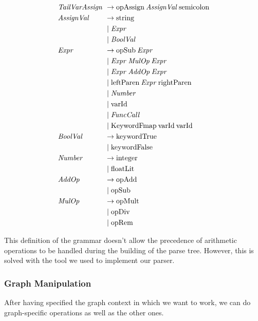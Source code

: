 \begin{align*}
    \omit $\mathit{TailVarAssign}$ \hfil & \rightarrow \text{opAssign} \: \mathit{AssignVal} \: \text{semicolon} \\
    \omit $\mathit{AssignVal}$ \hfil & \rightarrow \text{string} \\
    & \mid \mathit{Expr} \\
    & \mid \mathit{BoolVal}\\
    \omit $\mathit{Expr}$ \hfil & \rightarrow \text{opSub} \: \mathit{Expr} \\
    & \mid \mathit{Expr} \: \mathit{MulOp} \: \mathit{Expr} \\
    & \mid \mathit{Expr} \: \mathit{AddOp} \: \mathit{Expr} \\
    & \mid \text{leftParen}\: \mathit{Expr} \: \text{rightParen} \\
    & \mid \mathit{Number} \\
    & \mid \text{varId} \\
    & \mid \mathit{FuncCall} \\
    & \mid \text{KeywordFmap} \: \text{varId} \: \text{varId} \\
    \omit $\mathit{BoolVal}$ \hfil & \rightarrow \text{keywordTrue} \\
    & \mid \text{keywordFalse} \\
    \omit $\mathit{Number}$ \hfil & \rightarrow \text{integer} \\
    & \mid \text{floatLit} \\
    \omit $\mathit{AddOp}$ \hfil & \rightarrow \text{opAdd} \\
    & \mid \text{opSub} \\
    \omit $\mathit{MulOp}$ \hfil & \rightarrow \text{opMult} \\
    & \mid \text{opDiv} \\
    & \mid \text{opRem} \\
\end{align*}

This definition of the grammar doesn't allow the precedence of arithmetic operations to be handled during the building of the parse tree.
However, this is solved with the tool we used to implement our parser.

\subsubsection*{Graph Manipulation}

After having specified the graph context in which we want to work, we can do graph-specific operations as well as the other ones.

